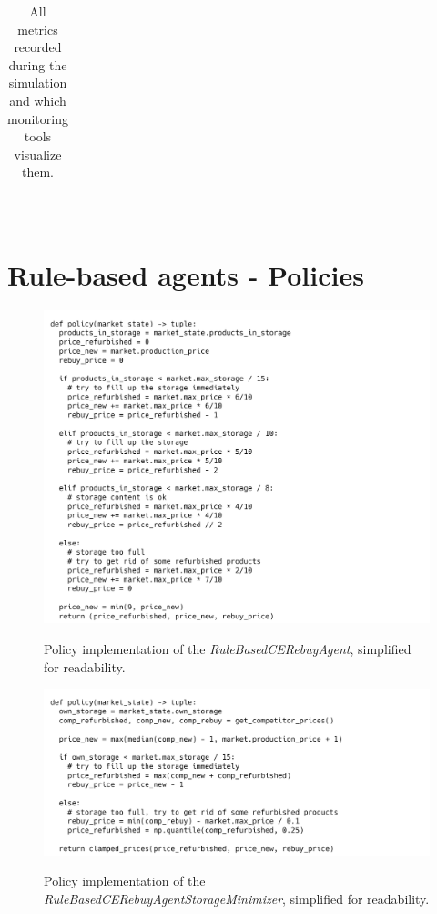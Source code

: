 \begin{table}[!]
\begin{tabular}{|cr|p{2.2mm}|p{2.2mm}|p{2.2mm}|p{2.2mm}|p{2.2mm}|p{2.2mm}|p{2.2mm}|p{2.2mm}|p{2.2mm}|p{2.2mm}|p{2.2mm}|p{2.2mm}|p{2.2mm}|p{2.2mm}|p{2.2mm}|p{2.2mm}|}
	\end{tabular}\\
	\caption{All metrics recorded during the simulation and which monitoring tools visualize them.}\label{tab:AllMetrics}
\end{table}

\newpage
\section{Rule-based agents - Policies}\label{sec:AppendixPolicies}

\begin{figure}[ht]
	\includegraphics[width = \textwidth]{images/policies/RuleBasedCERebuyAgentPolicy.png}\\
	\caption{Policy implementation of the \emph{RuleBasedCERebuyAgent}, simplified for readability.}\label{fig:PolicyRuleBasedCERebuy}
\end{figure}

\begin{figure}[ht]
	\includegraphics[width = \textwidth]{images/policies/RuleBasedCERebuyAgentStorageMinimizerPolicy.png}\\
	\caption{Policy implementation of the \emph{RuleBasedCERebuyAgentStorageMinimizer}, simplified for readability.}\label{fig:PolicyRuleBasedStorageMinimizer}
\end{figure}

